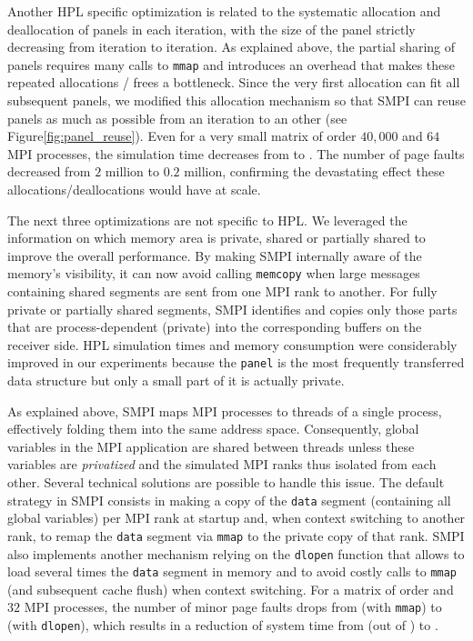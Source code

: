         Another HPL specific optimization is related to the systematic allocation and deallocation of panels in each
        iteration, with the size of the panel strictly decreasing from iteration to iteration. As explained above,
        the partial sharing of panels requires many calls to \texttt{mmap} and introduces an overhead that makes these
        repeated allocations / frees a bottleneck. Since the very first allocation can fit all subsequent panels, we
        modified this allocation mechanism so that SMPI can reuse panels as much as possible from an iteration to an
        other (see Figure\ref{fig:panel_reuse}). Even for a very small matrix of order \(40,000\) and \(64\) MPI
        processes, the simulation time decreases from  to .  The number of page faults
        decreased from \(2\) million to \(0.2\) million, confirming the devastating effect these
        allocations/deallocations would have at scale.

        The next three optimizations are not specific to HPL.  We leveraged the information on which memory area is
        private, shared or partially shared to improve the overall performance.  By making SMPI internally aware of the
        memory's visibility, it can now avoid calling \texttt{memcopy} when large messages containing shared segments
        are sent from one MPI rank to another.  For fully private or partially shared segments, SMPI identifies and
        copies only those parts that are process-dependent (private) into the corresponding buffers on the receiver
        side.  HPL simulation times and memory consumption were considerably improved in our experiments because the
        \texttt{panel} is the most frequently transferred data structure but only a small part of it is actually
        private.

        As explained above, SMPI maps MPI processes to threads of a single process, effectively folding them into the
        same address space.  Consequently, global variables in the MPI application are shared between threads unless
        these variables are \emph{privatized} and the simulated MPI ranks thus isolated from each other. Several
        technical solutions are possible to handle this issue\cite{smpi}. The default strategy in SMPI consists in
        making a copy of the \texttt{data} segment (containing all global variables) per MPI rank at startup and, when
        context switching to another rank, to remap the \texttt{data} segment via \texttt{mmap} to the private copy of
        that rank.  SMPI also implements another mechanism relying on the \texttt{dlopen} function that allows to load
        several times the \texttt{data} segment in memory and to avoid costly calls to \texttt{mmap} (and subsequent
        cache flush) when context switching. For a matrix of order  and \(32\) MPI processes, the number of
        minor page faults drops from  (with \texttt{mmap}) to  (with \texttt{dlopen}), which
        results in a reduction of system time from  (out of ) to .

